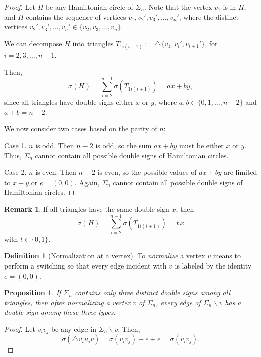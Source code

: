 \documentclass[12pt]{amsart}
\theoremstyle{plain}
\newtheorem{proposition}[theorem]{Proposition}%
\theoremstyle{definition}%
\newtheorem{remark}{Remark}%
\newtheorem{definition}{Definition}
\begin{document}
\begin{proof}
Let \(H\) be any Hamiltonian circle of \(\Sigma_n\). Note that the vertex \(v_1\) is in \(H\), and \(H\) contains the sequence of vertices \(v_1, v_2', v_3', \ldots, v_n'\), where the distinct vertices \( v_2', v_3', \ldots, v_n' \in \{v_2, v_3, \ldots, v_n\}\). 

We can decompose \(H\) into triangles \(T_{1i(i+1)} := \triangle \{v_1, v_i', v_{i+1}'\}\), for \(i = 2, 3, \ldots, n - 1\).



Then,
\[
\sigma({H}) = \sum_{i=2}^{n-1} \sigma(T_{1i(i+1)}) = a x + b y,
\]
since all triangles have double signs either \(x\) or \(y\), where \(a, b \in \{0, 1, \ldots, n - 2\}\) and \(a + b = n - 2\).

We now consider two cases based on the parity of \(n\):

Case 1. \(n\) is odd. Then \(n-2\) is odd, so the sum  \(a x + b y\) must be either \(x\) or \(y\). 
Thus, \(\Sigma_n\) cannot contain all possible double signs of Hamiltonian circles.

Case 2. \(n\) is even. Then \(n-2\) is even, so the possible values of \(a x + b y\) are limited to \(x+y\) or \(e = (0,0)\). Again, \(\Sigma_n\) cannot contain all possible double signs of Hamiltonian circles.
\end{proof}


\begin{remark}\label{rem:one}
If all triangles have the same double sign $x$, then
\[\sigma(H)=\sum_{i=2}^{n-1}\sigma(T_{1i(i+1)})=t\,x\] with \(t\in\{0,1\}\).
\end{remark}








\begin{definition}[Normalization at a vertex]
To \emph{normalize} a vertex \(v\) means to perform a switching so that every edge
incident with \(v\) is labeled by the identity \(e=(0,0)\).
\end{definition}


\begin{proposition}
    If \(\Sigma_n\) contains only three distinct  double signs among all triangles, then after normalizing a vertex $v$ of \(\Sigma_n\),   every edge of \(\Sigma_n\backslash v\) has a double sign among these three types.
\end{proposition}

\begin{proof}
    Let $v_iv_j$ be any edge in \(\Sigma_n\backslash v\). Then, $$ \sigma(\triangle v_iv_jv)=\sigma(v_iv_j)+e+e=\sigma(v_iv_j).$$
\end{proof}
\end{document}
